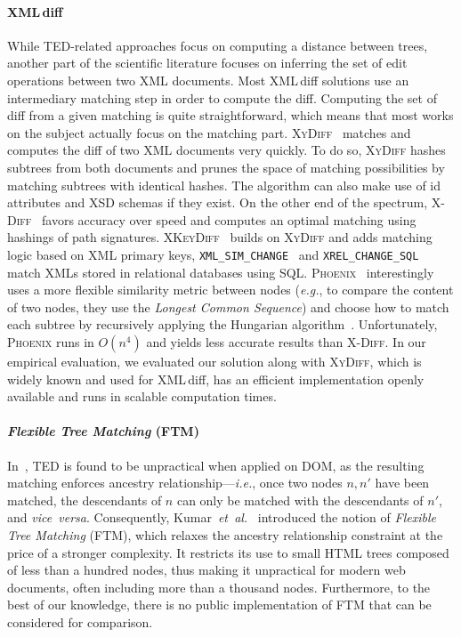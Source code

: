 \paragraph{\bf XML\,diff}\label{sftm:sec:xmldiff}
While TED-related approaches focus on computing a distance between trees, another part of the scientific literature focuses on inferring the set of edit operations between two XML documents.
Most XML\,diff solutions use an intermediary matching step in order to compute the diff.
Computing the set of diff from a given matching is quite straightforward, which means that most works on the subject actually focus on the matching part.
\textsc{XyDiff}~\cite{Cobena2002DetectingDocuments} matches and computes the diff of two XML documents very quickly.
To do so, \textsc{XyDiff} hashes subtrees from both documents and prunes the space of matching possibilities by matching subtrees with identical hashes.
The algorithm can also make use of id attributes and XSD schemas if they exist.
On the other end of the spectrum, \textsc{X-Diff}~\cite{wang2003x} favors accuracy over speed and computes an optimal matching using hashings of path signatures.
\textsc{XKeyDiff}~\cite{dos2007semantical} builds on \textsc{XyDiff} and adds matching logic based on XML primary keys, \texttt{XML\_SIM\_CHANGE}~\cite{viyanon2010xml} and \texttt{XREL\_CHANGE\_SQL}~\cite{sundaram2012change} match XMLs stored in relational databases using SQL. 
\textsc{Phoenix}~\cite{oliveira2018efficient} interestingly uses a more flexible similarity metric between nodes (\emph{e.g.}, to compare the content of two nodes, they use the \emph{Longest Common Sequence}) and choose how to match each subtree by recursively applying the Hungarian algorithm~\cite{kuhn1955hungarian}.
Unfortunately, \textsc{Phoenix} runs in $O(n^4)$ and yields less accurate results than \textsc{X-Diff}.
In our empirical evaluation, we evaluated our solution along with \textsc{XyDiff}, which is widely known and used for XML\,diff, has an efficient implementation openly available and runs in scalable computation times.

\paragraph{\bf \emph{Flexible Tree Matching} (FTM)}
In~\cite{Kumar2011_Bricolage}, TED is found to be unpractical when applied on DOM, as the resulting matching enforces ancestry relationship---\emph{i.e.}, once two nodes $n, n'$ have been matched, the descendants of $n$ can only be matched with the descendants of $n'$, and \emph{vice~versa}. 
Consequently, Kumar~\emph{et~al.}~\cite{Kumar2011_Bricolage, Kumar2011_FTM} introduced the notion of \textit{Flexible Tree Matching} (FTM), which relaxes the ancestry relationship constraint at the price of a stronger complexity.
It restricts its use to small HTML trees composed of less than a hundred nodes, thus making it unpractical for modern web documents, often including more than a thousand nodes.
Furthermore, to the best of our knowledge, there is no public implementation of FTM that can be considered for comparison.


